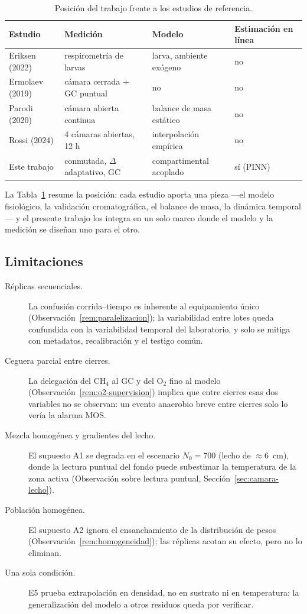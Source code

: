 \begin{table}[htbp]
  \centering
  \caption{Posición del trabajo frente a los estudios de referencia.}
  \label{tab:posicion}
  \begin{tabular}{llll}
    \hline
    Estudio & Medición & Modelo & Estimación en línea \\
    \hline
    Eriksen (2022) & respirometría de larvas & larva, ambiente exógeno & no \\
    Ermolaev (2019) & cámara cerrada + GC puntual & no & no \\
    Parodi (2020) & cámara abierta continua & balance de masa estático & no \\
    Rossi (2024) & 4 cámaras abiertas, 12 h & interpolación empírica & no \\
    Este trabajo & conmutada, $\Delta$ adaptativo, GC & compartimental acoplado & sí (PINN) \\
    \hline
  \end{tabular}
\end{table}

La Tabla~\ref{tab:posicion} resume la posición: cada estudio aporta una
pieza ---el modelo fisiológico, la validación cromatográfica, el balance de
masa, la dinámica temporal--- y el presente trabajo los integra en un solo
marco donde el modelo y la medición se diseñan uno para el otro.

\subsection{Limitaciones}

\begin{description}
  \item[Réplicas secuenciales.] La confusión corrida--tiempo es inherente al
  equipamiento único (Observación~\ref{rem:paralelizacion}); la variabilidad
  entre lotes queda confundida con la variabilidad temporal del laboratorio,
  y solo se mitiga con metadatos, recalibración y el testigo común.
  \item[Ceguera parcial entre cierres.] La delegación del CH$_4$ al GC y del
  O$_2$ fino al modelo (Observación~\ref{rem:o2-supervision}) implica que
  entre cierres esas dos variables no se observan: un evento anaerobio
  breve entre cierres solo lo vería la alarma MOS.
  \item[Mezcla homogénea y gradientes del lecho.] El supuesto A1 se degrada
  en el escenario $N_0 = 700$ (lecho de $\approx 6$~cm), donde la lectura
  puntual del fondo puede subestimar la temperatura de la zona activa
  (Observación sobre lectura puntual, Sección~\ref{sec:camara-lecho}).
  \item[Población homogénea.] El supuesto A2 ignora el ensanchamiento de la
  distribución de pesos (Observación~\ref{rem:homogeneidad}); las réplicas
  acotan su efecto, pero no lo eliminan.
  \item[Una sola condición.] E5 prueba extrapolación en densidad, no en
  sustrato ni en temperatura: la generalización del modelo a otros residuos
  queda por verificar.
\end{description}

